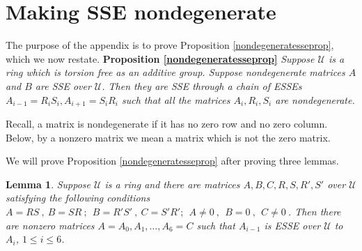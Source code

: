 \documentclass{amsart}
\newtheorem{lemma}[theorem]{Lemma}
\theoremstyle{definition}
\theoremstyle{remark}
\numberwithin{equation}{section}
\begin{document}
{{ 

\appendix 
\section{Making SSE nondegenerate} \label{nondegenerateappendix} 

The purpose of the appendix is to prove
Proposition \ref{nondegeneratesseprop}, which we now restate. 
\newline \newline 
{\bf Proposition \ref{nondegeneratesseprop}} 
{\it 
Suppose ${\mathcal U}$ is a ring which is torsion free as an additive group. 
Suppose nondegenerate matrices $A$ and $B$ are SSE over ${\mathcal U}$. 
Then they are SSE through a chain of ESSEs 
$A_{i-1} =R_iS_i, A_{i+1}=S_iR_i$ such that all the matrices 
$A_i, R_i,S_i $ are nondegenerate. } 
 
Recall, a matrix is nondegenerate if it has no zero row and no zero 
column. Below, by a nonzero matrix we mean a matrix which is not 
the zero matrix. 

We will prove  Proposition 
 \ref{nondegeneratesseprop} after proving three lemmas. 

\begin{lemma} \label{onezerotonozero}
Suppose ${\mathcal U}$ is a ring and there are matrices 
$A,B,C,R,S,R',S'$ 
over ${\mathcal U}$ 
satisfying the following conditions
$A = RS\ , \   B=SR\ ;\ \ 
B = R'S'\ , \   C=S'R'   ;\ \ 
A \neq 0\ ,  \ \  B = 0 \ ,  \ \  C \neq 0 \  
$.  
Then there are nonzero matrices $A=A_0, A_1, \dots , A_6=C$  such 
that $A_{i-1} $ is ESSE over ${\mathcal U}$ to $A_i$, $1\leq i \leq 6$. 
\end{lemma} 

}}
\end{document}
